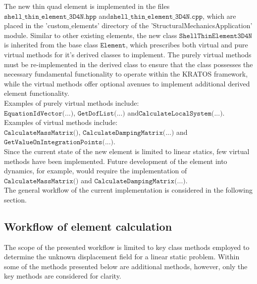 The new thin quad element is implemented in the files $\texttt{shell\_thin\_element\_3D4N.hpp}$ and\break$\texttt{shell\_thin\_element\_3D4N.cpp}$, which are placed in the 'custom$\_$elements' directory of the 'StructuralMechanicsApplication' module. Similar to other existing elements, the new class $\texttt{ShellThinElement3D4N}$ is inherited from the base class $\texttt{Element}$, which prescribes both virtual and pure virtual methods for it's derived classes to implement. The purely virtual methods must be re-implemented in the derived class to ensure that the class possesses the necessary fundamental functionality to operate within the KRATOS framework, while the virtual methods offer optional avenues to implement additional derived element functionality. \\

Examples of purely virtual methods include: $\texttt{EquationIdVector(...),\ GetDofList(...)}$ and\break $\texttt{CalculateLocalSystem(...)}$. \\

Examples of virtual methods include: $\texttt{CalculateMassMatrix(),\ CalculateDampingMatrix(...)}$ and $\texttt{GetValueOnIntegrationPoints(...)}$. \\

Since the current state of the new element is limited to linear statics, few virtual methods have been implemented. Future development of the element into dynamics, for example, would require the implementation of $\texttt{CalculateMassMatrix()}$ and $\texttt{CalculateDampingMatrix(...)}$.\\

The general workflow of the current implementation is considered in the following section.

\subsection{Workflow of element calculation}

The scope of the presented workflow is limited to key class methods employed to determine the unknown displacement field for a linear static problem. Within some of the methods presented below are additional methods, however, only the key methods are considered for clarity.





